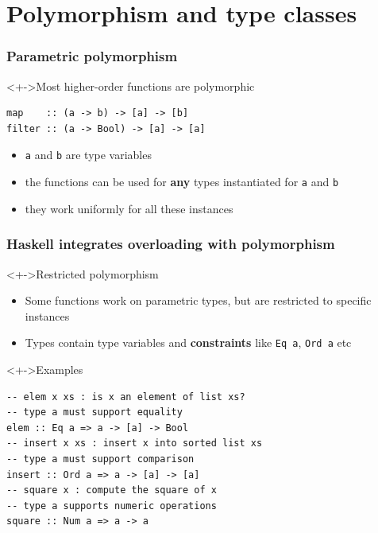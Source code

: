 \documentclass{beamer}
\begin{document}
\section{Polymorphism and type classes}
\begin{frame}[fragile]
  \frametitle{Parametric polymorphism}
  \begin{block}<+->{Most higher-order functions are polymorphic}
\begin{lstlisting}
map    :: (a -> b) -> [a] -> [b]
filter :: (a -> Bool) -> [a] -> [a]
\end{lstlisting}
    \begin{itemize}
    \item \lstinline{a} and \lstinline{b} are \alert{type variables}
    \item the functions can be used for \textbf{any} types
      instantiated for \lstinline{a} and \lstinline{b}
    \item they work uniformly for all these instances
    \end{itemize}
  \end{block}
\end{frame}
\begin{frame}[fragile]
  \frametitle{Haskell integrates overloading with polymorphism}
  \begin{block}<+->{Restricted polymorphism}
    \begin{itemize}
    \item Some functions work on parametric types, but are restricted to specific instances
    \item Types contain type variables and \textbf{constraints} like
      \lstinline{Eq a}, \lstinline{Ord a} etc
    \end{itemize}
  \end{block}
  \begin{block}<+->{Examples}
\begin{lstlisting}
-- elem x xs : is x an element of list xs?
-- type a must support equality
elem :: Eq a => a -> [a] -> Bool
-- insert x xs : insert x into sorted list xs
-- type a must support comparison
insert :: Ord a => a -> [a] -> [a]
-- square x : compute the square of x
-- type a supports numeric operations
square :: Num a => a -> a
\end{lstlisting}
  \end{block}
\end{frame}
\end{document}
